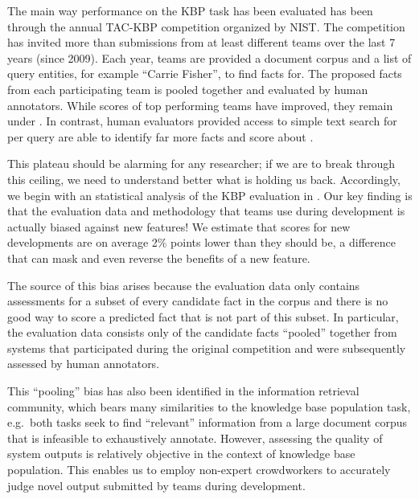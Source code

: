
The main way performance on the KBP task has been evaluated has been through the annual TAC-KBP competition organized by NIST.\@
The competition has invited more than  submissions from at least  different teams over the last 7 years (since 2009).
Each year, teams are provided a document corpus and a list of query entities, for example ``Carrie Fisher'', to find facts for.
The proposed facts from each participating team is pooled together and evaluated by human annotators.
While scores of top performing teams have improved, they remain under .
In contrast, human evaluators provided access to simple text search for  per query are able to identify far more facts and score about .

This plateau should be alarming for any researcher; if we are to break through this ceiling, we need to understand better what is holding us back.
Accordingly, we begin with an statistical analysis of the KBP evaluation in .
Our key finding is that the evaluation data and methodology that teams use during development is actually biased against new features!
We estimate that scores for new developments are on average 2\% points lower than they should be, a difference that can mask and even reverse the benefits of a new feature.

The source of this bias arises because 
the evaluation data only contains assessments for a subset of every candidate fact in the corpus
and there is no good way to score a predicted fact that is not part of this subset.
In particular, the evaluation data consists only of the candidate facts ``pooled'' together from systems that participated during the original competition and were subsequently assessed by human annotators.

This ``pooling'' bias has also been identified in the information retrieval community\needcite, which bears many similarities to the knowledge base population task, e.g.\ both tasks seek to find ``relevant'' information from a large document corpus that is infeasible to exhaustively annotate.
However, assessing the quality of system outputs is relatively objective in the context of knowledge base population.
This enables us to employ non-expert crowdworkers to accurately judge novel output submitted by teams during development.

